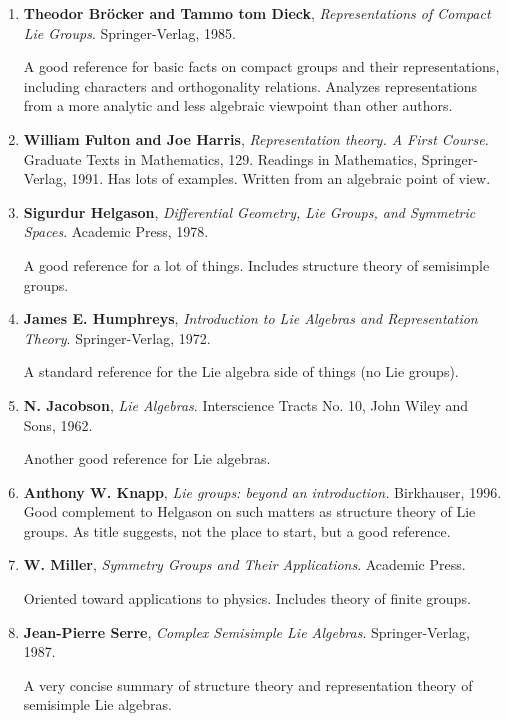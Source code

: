 \documentclass{amsbook}
\theoremstyle{plain}
\numberwithin{equation}{chapter}
\numberwithin{theorem}{chapter}
\begin{document}
\begin{enumerate}
\item \textbf{Theodor Br\"{o}cker and Tammo tom Dieck},
\textit{Representations of Compact Lie Groups}. Springer-Verlag, 1985.

A good reference for basic facts on compact groups and their representations,
including characters and orthogonality relations. Analyzes representations
from a more analytic and less algebraic viewpoint than other authors.

\item \textbf{William Fulton and Joe Harris}, \textit{Representation theory. A
First Course.} Graduate Texts in Mathematics, 129. Readings in Mathematics,
Springer-Verlag, 1991. Has lots of examples. Written from an algebraic point
of view.

\item \textbf{Sigurdur Helgason}, \textit{Differential Geometry, Lie Groups,
and Symmetric Spaces}. Academic Press, 1978.

A good reference for a lot of things. Includes structure theory of semisimple groups.

\item \textbf{James E. Humphreys}, \textit{Introduction to Lie Algebras and
Representation Theory}. Springer-Verlag, 1972.

A standard reference for the Lie algebra side of things (no Lie groups).

\item \textbf{N. Jacobson}, \textit{Lie Algebras}. Interscience Tracts No. 10,
John Wiley and Sons, 1962.

Another good reference for Lie algebras.

\item \textbf{Anthony W. Knapp}, \textit{Lie groups: beyond an introduction.}
Birkhauser, 1996. Good complement to Helgason on such matters as structure
theory of Lie groups. As title suggests, not the place to start, but a good reference.

\item \textbf{W. Miller}, \textit{Symmetry Groups and Their Applications}.
Academic Press.

Oriented toward applications to physics. Includes theory of finite groups.

\item \textbf{Jean-Pierre Serre}, \textit{Complex Semisimple Lie Algebras}.
Springer-Verlag, 1987.

A very concise summary of structure theory and representation theory of
semisimple Lie algebras.


\end{enumerate}
\end{document}
